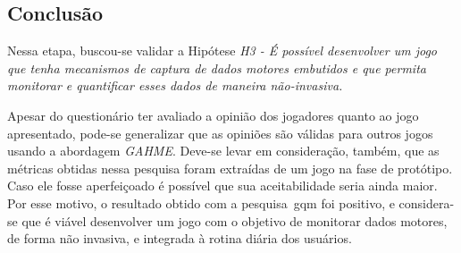 %

\subsection{Conclusão} 
Nessa etapa, buscou-se validar a Hipótese \textit{H3 - É possível desenvolver um jogo que tenha mecanismos de captura de dados motores embutidos e que permita monitorar e quantificar esses dados de maneira não-invasiva.} 

Apesar do questionário ter avaliado a opinião dos jogadores quanto ao jogo apresentado, pode-se generalizar que as opiniões são válidas para outros jogos usando a abordagem \textit{GAHME}. Deve-se levar em consideração, também, que as métricas obtidas nessa pesquisa foram extraídas de um jogo na fase de protótipo. Caso ele fosse aperfeiçoado é possível que sua aceitabilidade seria ainda maior. Por esse motivo, o resultado obtido com a pesquisa~\ac{gqm} foi positivo, e considera-se que é viável desenvolver um jogo com o objetivo de monitorar dados motores, de forma não invasiva, e integrada à rotina diária dos usuários.



